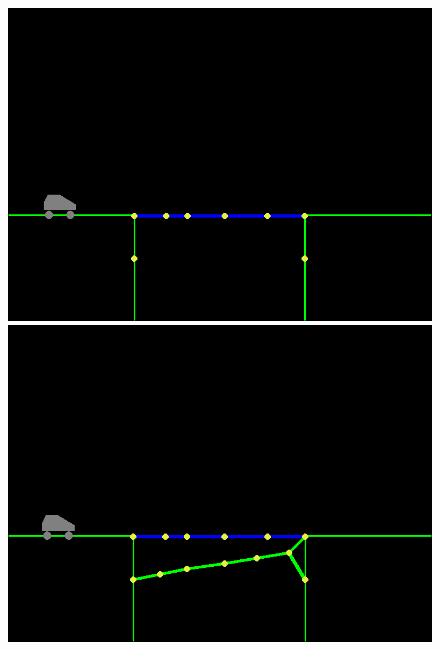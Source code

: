 \begin{figure}[ht]
    \centering
    \begin{minipage}{0.32\textwidth}
        \centering
        \includegraphics[width=\linewidth]{img/better_init1.png}
    \end{minipage}\hfill
    \begin{minipage}{0.32\textwidth}
        \centering
        \includegraphics[width=\linewidth]{img/better_init2.png}
    \end{minipage}
    \begin{minipage}{0.32\textwidth}
        \centering

\end{minipage}
\end{figure}
